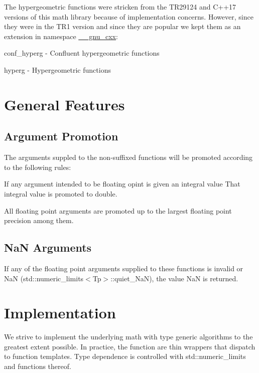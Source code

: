 The hypergeometric functions were stricken from the T\+R29124 and C++17 versions of this math library because of implementation concerns. However, since they were in the T\+R1 version and since they are popular we kept them as an extension in namespace {\ttfamily \hyperlink{namespace____gnu__cxx}{\+\_\+\+\_\+gnu\+\_\+cxx}\+:} 
\begin{DoxyItemize}
\item conf\+\_\+hyperg -\/ Confluent hypergeometric functions
\item hyperg -\/ Hypergeometric functions
\end{DoxyItemize}\hypertarget{index_general}{}\section{General Features}\label{index_general}
\hypertarget{index_promotion}{}\subsection{Argument Promotion}\label{index_promotion}
The arguments suppled to the non-\/suffixed functions will be promoted according to the following rules\+:
\begin{DoxyEnumerate}
\item If any argument intended to be floating opint is given an integral value That integral value is promoted to double.
\item All floating point arguments are promoted up to the largest floating point precision among them.
\end{DoxyEnumerate}\hypertarget{index_NaN}{}\subsection{Na\+N Arguments}\label{index_NaN}
If any of the floating point arguments supplied to these functions is invalid or Na\+N (std\+::numeric\+\_\+limits$<$\+Tp$>$\+::quiet\+\_\+\+Na\+N), the value Na\+N is returned.\hypertarget{index_impl}{}\section{Implementation}\label{index_impl}
We strive to implement the underlying math with type generic algorithms to the greatest extent possible. In practice, the function are thin wrappers that dispatch to function templates. Type dependence is controlled with std\+::numeric\+\_\+limits and functions thereof.

